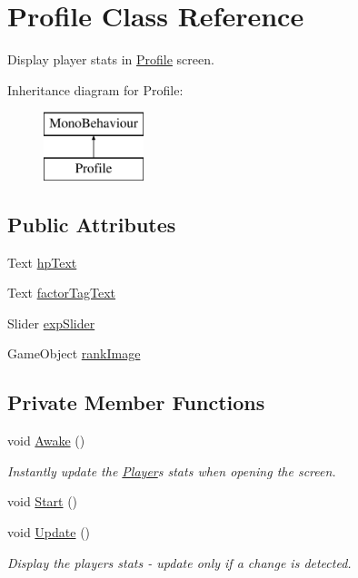 \hypertarget{class_profile}{}\section{Profile Class Reference}
\label{class_profile}


Display player stats in \mbox{\hyperlink{class_profile}{Profile}} screen.  


Inheritance diagram for Profile\+:\begin{figure}[H]
\begin{center}
\leavevmode
\includegraphics[height=2.000000cm]{class_profile}
\end{center}
\end{figure}
\subsection*{Public Attributes}
\begin{DoxyCompactItemize}
\item 
Text \mbox{\hyperlink{class_profile_a90a096b69972b98844a1d7c1d5693aa2}{hp\+Text}}
\item 
Text \mbox{\hyperlink{class_profile_a7549355a6c1d99e1c531a22a6ea1ff13}{factor\+Tag\+Text}}
\item 
Slider \mbox{\hyperlink{class_profile_a0306dcba07967820862a6161008f20c2}{exp\+Slider}}
\item 
Game\+Object \mbox{\hyperlink{class_profile_a60c8b525cd7a039a98226586b789c75a}{rank\+Image}}
\end{DoxyCompactItemize}
\subsection*{Private Member Functions}
\begin{DoxyCompactItemize}
\item 
void \mbox{\hyperlink{class_profile_aa17a7ceae100a98b5962b238758a72b0}{Awake}} ()
\begin{DoxyCompactList}\small\item\em Instantly update the \mbox{\hyperlink{class_player}{Player}}\textquotesingle{}s stats when opening the screen. \end{DoxyCompactList}\item 
void \mbox{\hyperlink{class_profile_a647e62f8ea4ea155450b61f840196144}{Start}} ()
\item 
void \mbox{\hyperlink{class_profile_a2764f91d58e74837f15fcea7b04635b7}{Update}} ()
\begin{DoxyCompactList}\small\item\em Display the player\textquotesingle{}s stats -\/ update only if a change is detected. \end{DoxyCompactList}\end{DoxyCompactItemize}
